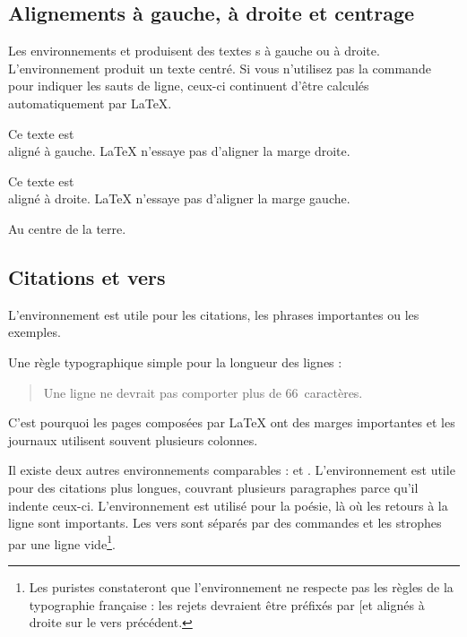 \subsection{Alignements à gauche, à droite et centrage}

Les environnements  et  produisent des
textes s à gauche ou à droite. L'environnement 
produit un texte centré. Si vous n'utilisez pas la commande \ci{\bs}
pour indiquer les sauts de ligne, ceux-ci continuent d'être calculés
automatiquement par \LaTeX{}.

\begin{example}
\begin{flushleft}
Ce texte est\\
aligné à gauche.
\LaTeX{} n'essaye pas
d'aligner la marge droite.
\end{flushleft}
\end{example}

\begin{example}
\begin{flushright}
Ce texte est\\
aligné à droite.
\LaTeX{} n'essaye pas
d'aligner la marge gauche.
\end{flushright}
\end{example}

\begin{example}
\begin{center}
Au centre de la terre.
\end{center}
\end{example}

\subsection{Citations et vers}

L'environnement  est utile pour les citations, les phrases
importantes ou les exemples.

\begin{example}
Une règle typographique
simple pour la longueur
des lignes :
\begin{quote}
Une ligne ne devrait pas comporter
plus de 66~caractères.
\end{quote}
C'est pourquoi les pages
composées par \LaTeX{} ont des
marges importantes et
les journaux utilisent
souvent plusieurs colonnes.
\end{example}

Il existe deux autres environnements comparables :  et
. L'environnement  est utile pour des
citations plus longues, couvrant plusieurs
paragraphes parce qu'il indente ceux-ci.
L'environnement  est utilisé pour la poésie, là
où les retours à la ligne sont importants. Les vers sont séparés par
des commandes \ci{\bs} et les strophes par une ligne vide\footnote{Les
puristes constateront que l'environnement  ne respecte pas
les règles de la typographie française : les rejets devraient être
préfixés par \og [\iffalse]\fi \fg et alignés à droite sur le vers précédent.}.

